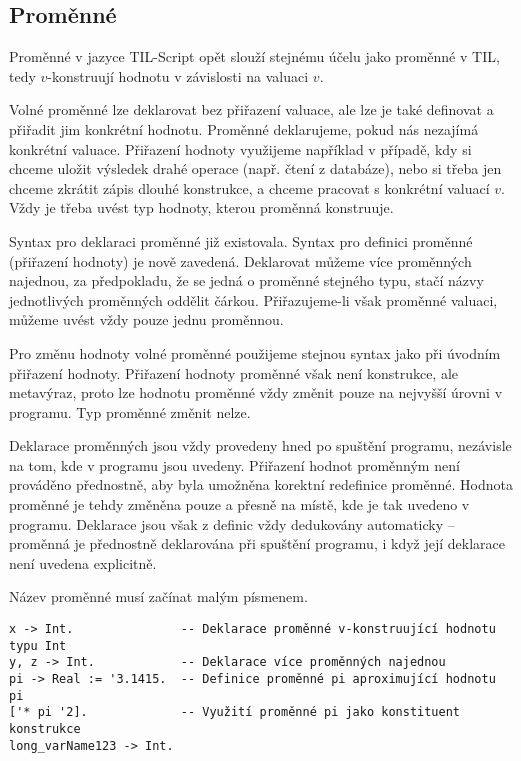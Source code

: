 \subsection{Proměnné}

Proměnné v jazyce TIL-Script opět slouží stejnému účelu jako proměnné v TIL, tedy $v$-konstruují
hodnotu v závislosti na valuaci $v$.

Volné proměnné lze deklarovat bez přiřazení valuace, ale lze je také definovat a přiřadit jim
konkrétní hodnotu. Proměnné deklarujeme, pokud nás nezajímá konkrétní valuace. Přiřazení hodnoty
využijeme například v případě, kdy si chceme uložit výsledek drahé operace (např. čtení
z databáze), nebo si třeba jen chceme zkrátit zápis dlouhé konstrukce, a chceme pracovat
s konkrétní valuací $v$. Vždy je třeba uvést typ hodnoty, kterou proměnná konstruuje.


Syntax pro deklaraci proměnné již existovala. Syntax pro definici proměnné (přiřazení hodnoty)
je nově zavedená. Deklarovat můžeme více proměnných najednou, za předpokladu, že se jedná o
proměnné stejného typu, stačí názvy jednotlivých proměnných oddělit čárkou. Přiřazujeme-li však
proměnné valuaci, můžeme uvést vždy pouze jednu proměnnou.

Pro změnu hodnoty volné proměnné použijeme stejnou syntax jako při úvodním přiřazení hodnoty.
Přiřazení hodnoty proměnné však není konstrukce, ale metavýraz, proto lze hodnotu proměnné vždy
změnit pouze na nejvyšší úrovni v programu. Typ proměnné změnit nelze.

Deklarace proměnných jsou vždy provedeny hned po spuštění programu, nezávisle na tom, kde v programu
jsou uvedeny. Přiřazení hodnot proměnným není prováděno přednostně, aby byla umožněna korektní
redefinice proměnné. Hodnota proměnné je tehdy změněna pouze a přesně na místě, kde je tak uvedeno
v programu. Deklarace jsou však z definic vždy dedukovány automaticky -- proměnná je přednostně
deklarována při spuštění programu, i když její deklarace není uvedena explicitně.

Název proměnné musí začínat malým písmenem. 

\begin{lstlisting}[caption={Příklad využití proměnných}]
x -> Int.               -- Deklarace proměnné v-konstruující hodnotu typu Int
y, z -> Int.            -- Deklarace více proměnných najednou
pi -> Real := '3.1415.  -- Definice proměnné pi aproximující hodnotu pi
['* pi '2].             -- Využití proměnné pi jako konstituent konstrukce
long_varName123 -> Int.
\end{lstlisting}

